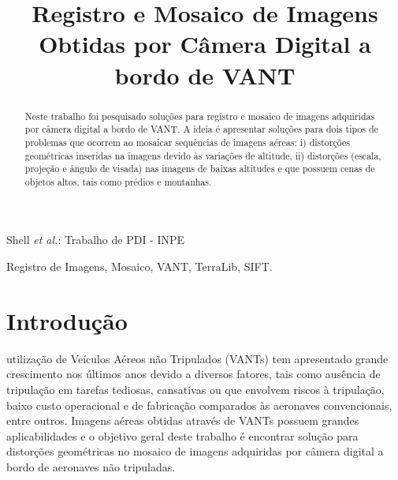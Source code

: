 \documentclass[9pt, a4paper, nofonttune, journal]{IEEEtran}
\begin{document}
\title{Registro e Mosaico de Imagens \\Obtidas por Câmera Digital a bordo de VANT}

\author{
}

%
{Shell \MakeLowercase{\textit{et al.}}: Trabalho de PDI - INPE}

\maketitle               
\renewcommand\abstractname{Resumo}
\renewcommand{\refname}{Referências}
\renewcommand\IEEEkeywordsname{Palavras-chave}


\begin{abstract}
Neste trabalho foi pesquisado soluções para registro e mosaico de imagens adquiridas por câmera digital a bordo de VANT. A ideia é apresentar soluções para dois tipos de problemas que ocorrem ao mosaicar sequências de imagens aéreas: i) distorções geométricas inseridas na imagens devido às variações de altitude, ii) distorções (escala, projeção e ângulo de visada) nas imagens de baixas altitudes e que possuem cenas de objetos altos, tais como prédios e montanhas.
\end{abstract}

\begin{IEEEkeywords}
Registro de Imagens, Mosaico, VANT, TerraLib, SIFT.
\end{IEEEkeywords}

\section{Introdução}
 utilização de Veículos Aéreos não Tripulados (VANTs) tem apresentado grande crescimento nos últimos anos devido a diversos fatores, 
tais como ausência de tripulação em tarefas tediosas, cansativas ou que envolvem riscos à tripulação, 
baixo custo operacional e de fabricação comparados às aeronaves convencionais, entre outros. 
Imagens aéreas obtidas através de VANTs possuem grandes aplicabilidades \cite{Canhoto}
 e o objetivo geral deste trabalho é encontrar solução para distorções geométricas no mosaico de imagens adquiridas por câmera digital a bordo de aeronaves não tripuladas.
\end{document}

